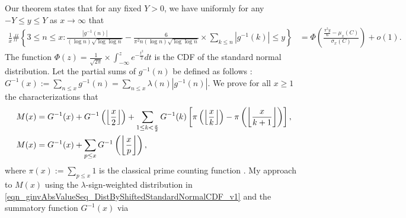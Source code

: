 \documentclass[10pt,reqno,letterpaper]{article}
\theoremstyle{plain}
\numberwithin{theorem}{section}
\theoremstyle{definition}
\newcommand{\Floor}[2]{\ensuremath{\left\lfloor \frac{#1}{#2} \right\rfloor}}
\newcommand{\seqnum}[1]{\href{http://oeis.org/#1}{\color{Gray!50!Black}{\underline{#1}}}}
\begin{document}
Our theorem states that for any fixed $Y > 0$, 
we have uniformly for any $-Y \leq y \leq Y$ as $x \rightarrow \infty$ that 
\begin{align} 
\label{eqn_ginvAbsValueSeq_DistByShiftedStandardNormalCDF_v1} 
\frac{1}{x} \#\left\{3 \leq n \leq x: 
     \frac{|g^{-1}(n)|}{(\log n) \sqrt{\log\log n}} - 
     \frac{6}{\pi^2 n (\log n) \sqrt{\log\log n}} 
     \times \sum_{k \leq n} |g^{-1}(k)| \leq y\right\} 
     & = 
     \Phi\left(\frac{\frac{\pi^2 y}{6}-\mu_x(C)}{\sigma_x(C)}\right) + 
     o(1). 
\end{align}
The function $\Phi(z) = \frac{1}{\sqrt{2\pi}} \times \int_{-\infty}^z e^{-\frac{t^2}{2}} dt$ 
is the CDF of the standard normal distribution. 
Let the partial sums of $g^{-1}(n)$ be defined as follows 
\cite[\seqnum{A341472}]{OEIS}: 
$G^{-1}(x) := \sum_{n \leq x} g^{-1}(n) = \sum_{n \leq x} \lambda(n) |g^{-1}(n)|$. 
We prove for all $x \geq 1$ the characterizations that 
\begin{align}
\notag 
M(x) & = G^{-1}(x) + G^{-1}\left(\Floor{x}{2}\right) + 
     \sum_{1 \leq k < \frac{x}{2}} G^{-1}(k) \left[ 
     \pi\left(\Floor{x}{k}\right) - \pi\left(\Floor{x}{k+1}\right) 
     \right], \\ 
\label{eqn_Mx_GInvx_SumOverPrimesFlooredFormula_v3} 
M(x) & = G^{-1}(x) + \sum_{\substack{p \leq x}} G^{-1}\left(\Floor{x}{p}\right), 
\end{align}
where $\pi(x) := \sum_{p \leq x} 1$ is the classical prime counting function \cite[\seqnum{A000720}]{OEIS}. 
My approach to $M(x)$ using the $\lambda$-sign-weighted distribution in 
\eqref{eqn_ginvAbsValueSeq_DistByShiftedStandardNormalCDF_v1} and the 
summatory function $G^{-1}(x)$ via 
\end{document}

